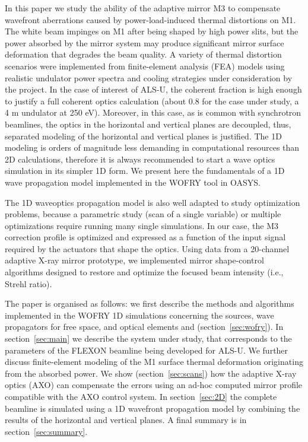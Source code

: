 \documentclass[preprint]{iucr}
\begin{document}
In this paper we study the ability of the adaptive mirror M3 to compensate wavefront aberrations caused by power-load-induced thermal distortions on M1. The white beam impinges on M1 after being shaped by high power slits, but the power absorbed by the mirror system may produce significant mirror surface deformation that degrades the beam quality. 
A variety of thermal distortion scenarios were implemented from finite-element analysis (FEA) models using realistic undulator power spectra and cooling strategies under consideration by the project.
In the case of interest of ALS-U, the coherent fraction is high enough to justify a full coherent optics calculation (about 0.8 for the case under study, a 4 m undulator at 250 eV). Moreover, in this case, as is common with synchrotron beamlines, the optics in the horizontal and vertical planes are decoupled, thus, separated modeling of the horizontal and vertical planes is justified. The 1D modeling is orders of magnitude less demanding in computational resources than 2D calculations, therefore it is always recommended to start a wave optics simulation in its simpler 1D form. We present here the fundamentals of a 1D wave propagation model implemented in the WOFRY \cite{codeWOFRY} tool in OASYS. 

The 1D waveoptics propagation model is also well adapted to study optimization problems, because a parametric study (scan of a single variable) or multiple optimizations require running many single simulations. In our case, the M3 correction profile is optimized and expressed as a function of the input signal required by the actuators that shape the optics. 
Using data from a 20-channel adaptive X-ray mirror prototype, we implemented mirror shape-control algorithms designed to restore and optimize the focused beam intensity (i.e., Strehl ratio).

The paper is organised as follows: we first describe the methods and algorithms implemented in the WOFRY 1D simulations concerning the sources, wave propagators for free space, and optical elements and (section~\ref{sec:wofry}). In section~\ref{sec:main} we describe the system under study, that corresponds to the parameters of the FLEXON beamline being developed for ALS-U. We further discuss finite-element modeling of the M1 surface thermal deformation originating from the absorbed power. We show (section~\ref{sec:scans}) how the adaptive X-ray optics (AXO) can compensate the errors using an ad-hoc computed mirror profile compatible with the AXO control system. In section~\ref{sec:2D} the complete beamline is simulated using a 1D wavefront propagation model by combining the results of the horizontal and vertical planes. A final summary is in section~\ref{sec:summary}.
\end{document}
